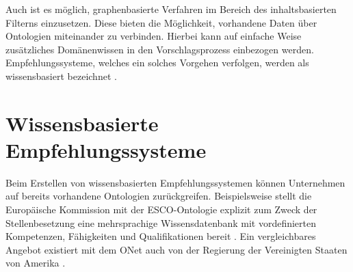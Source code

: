 Auch ist es möglich, graphenbasierte Verfahren im Bereich des inhaltsbasierten Filterns  einzusetzen. Diese bieten die Möglichkeit, vorhandene Daten über Ontologien miteinander zu verbinden. Hierbei kann auf einfache Weise zusätzliches Domänenwissen in den Vorschlagsprozess einbezogen werden. Empfehlungssysteme, welches ein solches Vorgehen verfolgen, werden als wissensbasiert bezeichnet \cite[S. 168f.]{recommenderSystems:2016}.

\section{Wissensbasierte Empfehlungssysteme}
\label{ch:empfehlungssysteme:wissensbasierteAnsaetze}
Beim Erstellen von wissensbasierten Empfehlungssystemen können Unternehmen auf bereits vorhandene Ontologien zurückgreifen. Beispielsweise stellt die Europäische Kommission mit der \ac{ESCO}-Ontologie explizit zum Zweck der Stellenbesetzung eine mehrsprachige Wissensdatenbank mit vordefinierten Kompetenzen, Fähigkeiten und Qualifikationen bereit \cite[S. 1ff.]{leVrang:2014}. Ein vergleichbares Angebot existiert mit dem \ac{ONet} auch von der Regierung der Vereinigten Staaten von Amerika \cite[S. 2]{aCombinedRepresentation:2018}.

